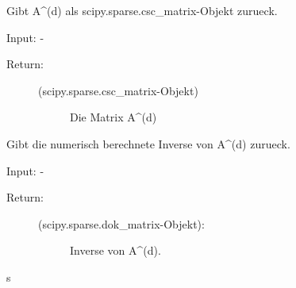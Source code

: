 \documentclass[letterpaper,10pt,ngerman]{sphinxmanual}
\begin{document}
\begin{fulllineitems}
\begin{fulllineitems}
\begin{description}
\begin{description}
\end{description}

\end{description}

\end{fulllineitems}


\begin{fulllineitems}
\label{\detokenize{index:sparse_erw.Sparse.return_mat_d_csc}}
Gibt A\textasciicircum{}(d) als scipy.sparse.csc\_matrix-Objekt zurueck.

Input: -
\begin{description}
\item[{Return:}] \leavevmode\begin{description}
\item[{(scipy.sparse.csc\_matrix-Objekt)}] \leavevmode
Die Matrix A\textasciicircum{}(d)

\end{description}

\end{description}

\end{fulllineitems}


\begin{fulllineitems}
\label{\detokenize{index:sparse_erw.Sparse.return_mat_d_inv}}
Gibt die numerisch berechnete Inverse von A\textasciicircum{}(d) zurueck.

Input: -
\begin{description}
\item[{Return:}] \leavevmode\begin{description}
\item[{(scipy.sparse.dok\_matrix-Objekt):}] \leavevmode
Inverse von A\textasciicircum{}(d).

\end{description}

\end{description}

\end{fulllineitems}


\end{fulllineitems}



\renewcommand{\indexname}{Python-Modulindex}
\begin{sphinxtheindex}
\def\bigletter#1{{\Large\sffamily#1}\nopagebreak\vspace{1mm}}
\bigletter{s}
\item {}
\end{sphinxtheindex}

\renewcommand{\indexname}{Stichwortverzeichnis}
\printindex
\end{document}

